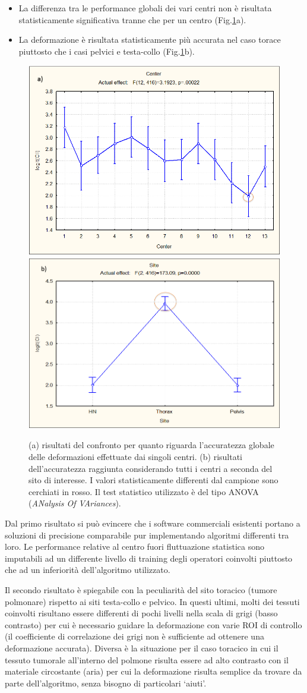 \begin{itemize}
\item La differenza tra le performance globali dei vari centri non è risultata statisticamente significativa tranne che per un centro (Fig.\ref{fig:YES_results}a). 
\item La deformazione è risultata statisticamente più accurata  nel caso torace piuttosto che i casi pelvici e testa-collo (Fig.\ref{fig:YES_results}b).
\end{itemize}
\begin{figure}
\centering
\includegraphics[width=.49\textwidth]{./cap3/YES_results_a.png}
\includegraphics[width=.49\textwidth]{./cap3/YES_results_b.png}
\caption{(a) risultati del confronto per quanto riguarda l'accuratezza globale delle deformazioni effettuate dai singoli centri. (b) risultati dell'accuratezza raggiunta considerando tutti i centri a seconda del sito di interesse. I valori statisticamente differenti dal campione sono cerchiati in rosso. Il test statistico utilizzato è del tipo ANOVA (\textit{ANalysis Of VAriances}).}
\label{fig:YES_results}
\end{figure}
Dal primo risultato si può evincere che i software commerciali esistenti portano a soluzioni di precisione comparabile pur implementando algoritmi differenti tra loro. Le performance relative al centro fuori fluttuazione statistica sono imputabili ad un differente livello di training degli operatori coinvolti piuttosto che ad un inferiorità dell'algoritmo utilizzato.

Il secondo risultato è spiegabile con la peculiarità del sito toracico (tumore polmonare) rispetto ai siti testa-collo e pelvico. In questi ultimi, molti dei tessuti coinvolti risultano essere differenti di pochi livelli nella scala di grigi (basso contrasto) per cui è necessario guidare la deformazione con varie ROI di controllo (il coefficiente di correlazione dei grigi non è sufficiente ad ottenere una deformazione accurata). Diversa è la situazione per il caso toracico in cui il tessuto tumorale all'interno del polmone risulta essere ad alto contrasto con il materiale circostante (aria) per cui la deformazione risulta semplice da trovare da parte dell'algoritmo, senza bisogno di particolari `aiuti'.\\

